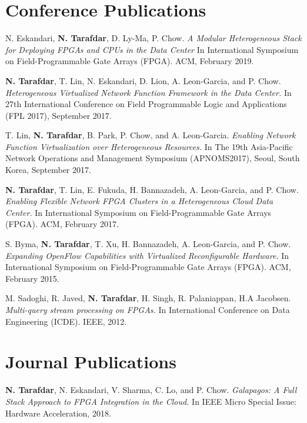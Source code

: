 

\section{\sc Conference Publications}

\onecol
{
  N. Eskandari, \textbf{N. Tarafdar}, D. Ly-Ma, P. Chow.
  \textit{A Modular Heterogeneous Stack for Deploying FPGAs and CPUs in the Data Center}
  In International Symposium on Field-Programmable Gate Arrays (FPGA). ACM, February 2019. 
}

\onecol
{
  \textbf{N. Tarafdar}, T. Lin, N. Eskandari, D. Lion, A. Leon-Garcia, and P. Chow.
  \textit{Heterogeneous Virtualized Network Function Framework in the Data Center.}
  In 27th International Conference on Field Programmable Logic and Applications (FPL 2017), September 2017. 
}

\onecol
{
  T. Lin, \textbf{N. Tarafdar}, B. Park, P. Chow, and A. Leon-Garcia.
  \textit{Enabling Network Function Virtualization over Heterogeneous Resources.}
  In The 19th Asia-Pacific Network Operations and Management Symposium (APNOMS2017), Seoul, South Korea, September 2017. 
}


\onecol
{
    \textbf{N. Tarafdar}, T. Lin, E. Fukuda, H. Bannazadeh, A. Leon-Garcia, and P. Chow. 
  \textit{Enabling Flexible Network FPGA Clusters in a Heterogeneous Cloud Data Center.}
  In International Symposium on Field-Programmable Gate Arrays (FPGA). ACM, February 2017. 
}

\onecol
{
  S. Byma, \textbf{N. Tarafdar}, T. Xu, H. Bannazadeh, A. Leon-Garcia, and P. Chow. 
  \textit{Expanding OpenFlow Capabilities with Virtualized Reconfigurable Hardware.}
  In International Symposium on Field-Programmable Gate Arrays (FPGA). ACM, February 2015.
}

\onecol
{
    M. Sadoghi, R. Javed, \textbf{N. Tarafdar}, H. Singh, R. Palaniappan, H.A Jacobsen.
  \textit{Multi-query stream processing on FPGAs.}
  In International Conference on Data Engineering (ICDE). IEEE, 2012.
}

\section{\sc Journal Publications}

\onecol
{
  \textbf{N. Tarafdar}, N. Eskandari, V. Sharma, C. Lo, and P. Chow. 
  \textit{Galapagos: A Full Stack Approach to FPGA Integration in the Cloud.}
  In IEEE Micro Special Issue: Hardware Acceleration, 2018.
}


